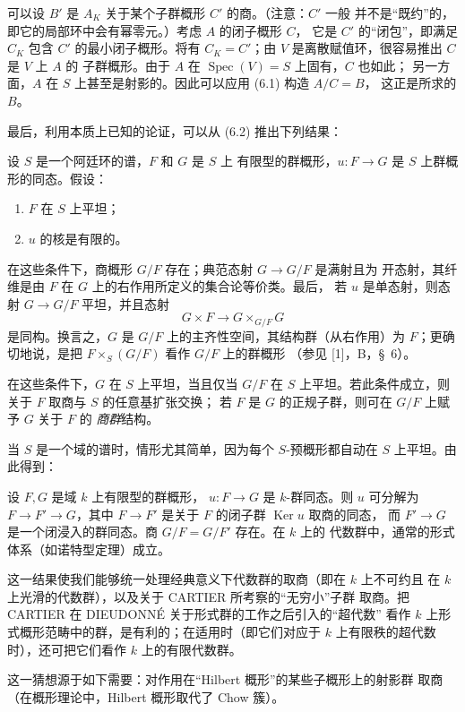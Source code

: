 可以设 $B'$ 是 $A_K$ 关于某个子群概形 $C'$ 的商。（注意：$C'$ 一般
并不是“既约”的，即它的局部环中会有幂零元。）考虑 $A$ 的闭子概形 $C$，
它是 $C'$ 的“闭包”，即满足 $C_K$ 包含 $C'$ 的最小闭子概形。将有
$C_K=C'$；由 $V$ 是离散赋值环，很容易推出 $C$ 是 $V$ 上 $A$ 的
子群概形。由于 $A$ 在 $\operatorname{Spec}(V)=S$ 上固有，$C$ 也如此；
另一方面，$A$ 在 $S$ 上甚至是射影的。因此可以应用 (6.1) 构造
$A/C=B$，
这正是所求的 $B$。

最后，利用本质上已知的论证，可以从 (6.2) 推出下列结果：

 设 $S$ 是一个阿廷环的谱，$F$ 和 $G$ 是 $S$ 上
有限型的群概形，$u:F\to G$ 是 $S$ 上群概形的同态。假设：
\begin{enumerate}
\item[(i)] $F$ 在 $S$ 上平坦；
\item[(ii)] $u$ 的核是有限的。
\end{enumerate}
在这些条件下，商概形 $G/F$ 存在；典范态射 $G\to G/F$ 是满射且为
开态射，其纤维是由 $F$ 在 $G$ 上的右作用所定义的集合论等价类。最后，
若 $u$ 是单态射，则态射 $G\to G/F$ 平坦，并且态射
\[
  G\times F\longrightarrow G\times_{G/F}G
\]
是同构。换言之，$G$ 是 $G/F$ 上的主齐性空间，其结构群（从右作用）为
$F$；更确切地说，是把 $F\times_S(G/F)$ 看作 $G/F$ 上的群概形
（参见 [1]，B，\S~6）。

 在这些条件下，$G$ 在 $S$ 上平坦，当且仅当 $G/F$
在 $S$ 上平坦。若此条件成立，则关于 $F$ 取商与 $S$ 的任意基扩张交换；
若 $F$ 是 $G$ 的正规子群，则可在 $G/F$ 上赋予 $G$ 关于 $F$ 的
\emph{商群}结构。

当 $S$ 是一个域的谱时，情形尤其简单，因为每个 $S$-预概形都自动在
$S$ 上平坦。由此得到：

 设 $F,G$ 是域 $k$ 上有限型的群概形，
$u:F\to G$ 是 $k$-群同态。则 $u$ 可分解为 $F\to F'\to G$，其中
$F\to F'$ 是关于 $F$ 的闭子群 $\operatorname{Ker}u$ 取商的同态，
而 $F'\to G$ 是一个闭浸入的群同态。商 $G/F=G/F'$ 存在。在 $k$ 上的
代数群中，通常的形式体系（如诺特型定理）成立。

这一结果使我们能够统一处理经典意义下代数群的取商（即在 $k$ 上不可约且
在 $k$ 上光滑的代数群），以及关于 CARTIER 所考察的“无穷小”子群
取商。把 CARTIER 在 DIEUDONNÉ 关于形式群的工作之后引入的“超代数”
看作 $k$ 上形式概形范畴中的群，是有利的；在适用时（即它们对应于
$k$ 上有限秩的超代数时），还可把它们看作 $k$ 上的有限代数群。


这一猜想源于如下需要：对作用在“Hilbert 概形”的某些子概形上的射影群
取商（在概形理论中，Hilbert 概形取代了 Chow 簇）。

